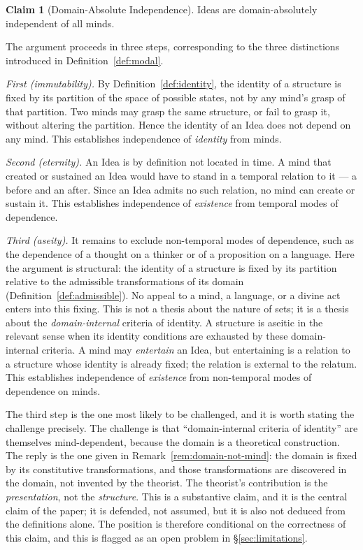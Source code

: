 \documentclass[11pt,a4paper]{article}
\theoremstyle{definition}
\newtheorem{claim}{Claim}[section]
\theoremstyle{remark}
\begin{document}
\begin{claim}[Domain-Absolute Independence]
Ideas are domain-absolutely independent of all minds.
\end{claim}

The argument proceeds in three steps, corresponding to the three
distinctions introduced in Definition~\ref{def:modal}.

\emph{First (immutability).} By Definition~\ref{def:identity}, the
identity of a structure is fixed by its partition of the space of
possible states, not by any mind's grasp of that partition. Two minds
may grasp the same structure, or fail to grasp it, without altering the
partition. Hence the identity of an Idea does not depend on any mind.
This establishes independence of \emph{identity} from minds.

\emph{Second (eternity).} An Idea is by definition not located in time.
A mind that created or sustained an Idea would have to stand in a
temporal relation to it --- a before and an after. Since an Idea admits
no such relation, no mind can create or sustain it. This establishes
independence of \emph{existence} from temporal modes of dependence.

\emph{Third (aseity).} It remains to exclude non-temporal modes of
dependence, such as the dependence of a thought on a thinker or of a
proposition on a language. Here the argument is structural: the
identity of a structure is fixed by its partition relative to the
admissible transformations of its domain
(Definition~\ref{def:admissible}). No appeal to a mind, a language, or
a divine act enters into this fixing. This is not a thesis about the
nature of sets; it is a thesis about the \emph{domain-internal}
criteria of identity. A structure is aseitic in the relevant sense
when its identity conditions are exhausted by these domain-internal
criteria. A mind may \emph{entertain} an Idea, but entertaining is a
relation to a structure whose identity is already fixed; the relation
is external to the relatum. This establishes independence of
\emph{existence} from non-temporal modes of dependence on minds.

The third step is the one most likely to be challenged, and it is
worth stating the challenge precisely. The challenge is that
``domain-internal criteria of identity'' are themselves
mind-dependent, because the domain is a theoretical construction. The
reply is the one given in Remark~\ref{rem:domain-not-mind}: the domain
is fixed by its constitutive transformations, and those
transformations are discovered in the domain, not invented by the
theorist. The theorist's contribution is the \emph{presentation}, not
the \emph{structure}. This is a substantive claim, and it is the
central claim of the paper; it is defended, not assumed, but it is
also not deduced from the definitions alone. The position is
therefore conditional on the correctness of this claim, and this is
flagged as an open problem in \S\ref{sec:limitations}.
\end{document}
